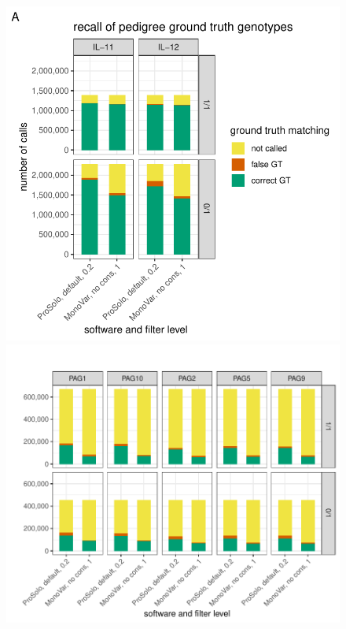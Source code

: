\documentclass[authoryear,preprint,11pt]{scrartcl}
\begin{document}
\begin{figure}[!tpb]
 \begin{minipage}{.45\linewidth}
  \includegraphics[width=\linewidth]{figs/Dong2017/Dong2017_genotyping_recall_prosolo_monovar.pdf}
  \end{minipage}
 \begin{minipage}{.53\linewidth}
  \includegraphics[width=\linewidth]{figs/Laehnemann2017/Laehnemann2017_genotyping_recall_prosolo_monovar.pdf}

\end{minipage}
\end{figure}
\end{document}
